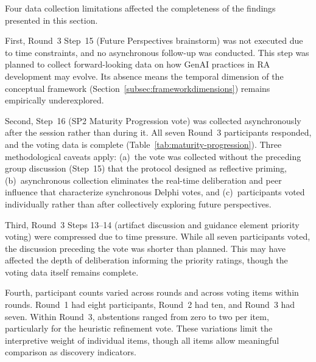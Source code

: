 Four data collection limitations affected the completeness of the findings
presented in this section.

First, Round~3 Step~15 (Future Perspectives brainstorm) was not executed due to
time constraints, and no asynchronous follow-up was conducted. This step was
planned to collect forward-looking data on how GenAI practices in RA development
may evolve. Its absence means the temporal dimension of the conceptual framework
(Section~\ref{subsec:frameworkdimensions}) remains empirically underexplored.

Second, Step~16 (SP2 Maturity Progression vote) was collected asynchronously
after the session rather than during it. All seven Round~3 participants
responded, and the voting data is complete
(Table~\ref{tab:maturity-progression}). Three methodological caveats apply:
(a)~the vote was collected without the preceding group discussion (Step~15) that
the protocol designed as reflective priming, (b)~asynchronous collection
eliminates the real-time deliberation and peer influence that characterize
synchronous Delphi votes, and (c)~participants voted individually rather than
after collectively exploring future perspectives.

Third, Round~3 Steps 13--14 (artifact discussion and guidance element priority
voting) were compressed due to time pressure. While all seven participants voted,
the discussion preceding the vote was shorter than planned. This may have
affected the depth of deliberation informing the priority ratings, though the
voting data itself remains complete.

Fourth, participant counts varied across rounds and across voting items within
rounds. Round~1 had eight participants, Round~2 had ten, and Round~3 had seven.
Within Round~3, abstentions ranged from zero to
two per item, particularly for the heuristic refinement vote. These variations limit the interpretive weight of individual items, though all
items allow meaningful comparison as discovery indicators.

